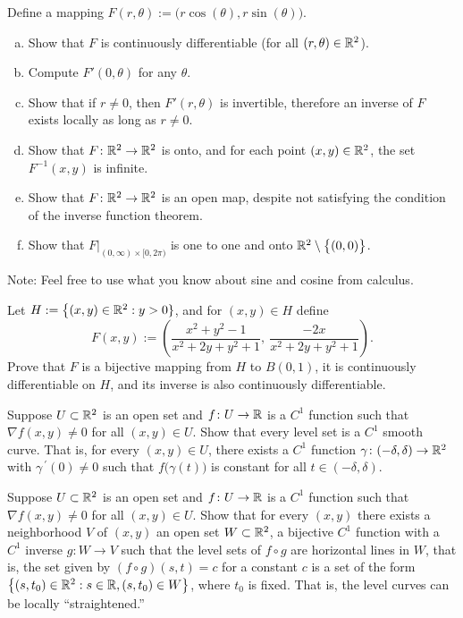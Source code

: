 \begin{exercise} \label{mv:exercise:polarcoordinates}
Define a mapping $F(r,\theta) := \bigl(r \cos(\theta), r \sin(\theta) \bigr)$.
\begin{enumerate}[a)]
\item
Show that $F$ is continuously differentiable (for all $(r,\theta) \in
{\mathbb{R}}^2$).
\item
Compute $F'(0,\theta)$ for any $\theta$.
\item
Show that if $r \not= 0$, then $F'(r,\theta)$ is invertible, therefore an
inverse of $F$ exists locally as long as $r \not= 0$.
\item
Show that $F \colon {\mathbb{R}}^2 \to {\mathbb{R}}^2$ is onto, and for each point $(x,y) \in
{\mathbb{R}}^2$, the set $F^{-1}(x,y)$ is infinite.
\item
Show that $F \colon {\mathbb{R}}^2 \to {\mathbb{R}}^2$ is an open map, despite not satisfying the condition of the
inverse function theorem.
\item
Show that $F|_{(0,\infty) \times [0,2\pi)}$ is one to one and onto
${\mathbb{R}}^2 \setminus \bigl\{ (0,0) \bigr\}$.
\end{enumerate}
Note: Feel free to use what you know about sine and cosine from calculus.
\end{exercise}

\begin{exercise}
Let $H := \bigl\{ (x,y) \in {\mathbb{R}}^2 : y > 0 \}$, and for $(x,y) \in H$
define
\begin{equation*}
F(x,y) := \left(
\frac{x^2+y^2-1}{x^2+2y+y^2+1}
,~
\frac{-2x}{x^2+2y+y^2+1}
\right) .
\end{equation*}
Prove that $F$ is a bijective mapping from $H$ to $B(0,1)$, it is
continuously differentiable on $H$, and its inverse is also continuously
differentiable.
\end{exercise}

\begin{exercise}
Suppose $U \subset {\mathbb{R}}^2$ is an open set and $f \colon U \to {\mathbb{R}}$ is
a $C^1$ function such
that $\nabla f(x,y) \not= 0$ for all $(x,y) \in U$.  Show that every
level set is a $C^1$ smooth curve.  That is,
for every
$(x,y) \in U$, there exists a $C^1$ function $\gamma \colon (-\delta,\delta)
\to {\mathbb{R}}^2$ with $\gamma^{\:\prime}(0) \not= 0$ such that
$f\bigl(\gamma(t)\bigr)$ is constant for all $t \in (-\delta,\delta)$.
\end{exercise}

\begin{exercise}
Suppose $U \subset {\mathbb{R}}^2$ is an open set and $f \colon U \to {\mathbb{R}}$ is
a $C^1$ function such
that $\nabla f(x,y) \not= 0$ for all $(x,y) \in U$.
Show that for every $(x,y)$ there exists a neighborhood $V$ of $(x,y)$
an open set $W \subset {\mathbb{R}}^2$, a bijective $C^1$ function with
a $C^1$ inverse $g \colon W \to V$ such that
the level sets of $f \circ g$ are horizontal lines in $W$, that is,
the set given by $(f \circ g) (s,t) = c$ for a constant $c$ is a set of the form
$\bigl\{ (s,t_0) \in {\mathbb{R}}^2 : s \in {\mathbb{R}}, (s,t_0) \in W \bigr\}$, where $t_0$ is fixed.
That is, the level curves can be locally ``straightened.''
\end{exercise}

